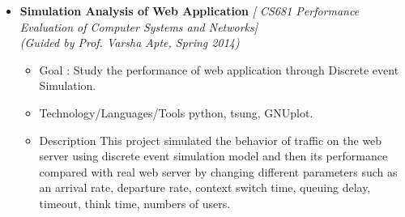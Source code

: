 \begin{itemize}
\item \textbf{Simulation Analysis of Web Application } \emph{[ CS681 Performance Evaluation of Computer Systems and Networks]} \\
	\emph{(Guided by Prof. Varsha Apte, Spring 2014)} \hfill \\[-0.6cm]
	\begin{itemize}
	  \item Goal : Study the performance of web application through Discrete event Simulation. \\[-0.6cm]
	      \item Technology/Languages/Tools  python, tsung, GNUplot. \\[-0.6cm]
	      \item Description 
	      This project simulated the behavior of traffic on the web server using discrete event simulation model and
	      then its performance compared with real web server by changing different parameters such as an arrival
	      rate, departure rate, context switch time, queuing delay, timeout, think time, numbers of users. \\[-0.6cm]
	\end{itemize}
	

\end{itemize}
